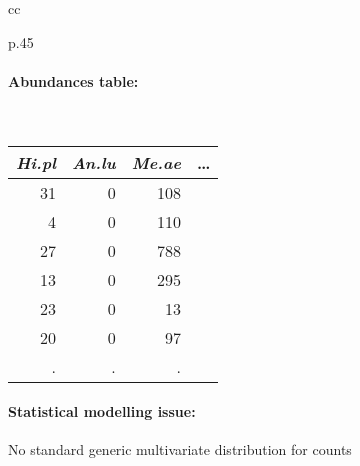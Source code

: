 \documentclass[8pt]{beamer}
\begin{document}
{\begin{tabular}{cc}
\begin{tabular}{p{}}
      \paragraph{Abundances table:} ~ \\
        {\footnotesize \begin{tabular}{rrrr}
        {\sl Hi.pl} & {\sl An.lu} & {\sl Me.ae} & \dots \\
        \hline
        31  &   0  & 108 & \\
         4  &   0  & 110 & \\
        27  &   0  & 788 & \\
        13  &   0  & 295 & \\
        23  &   0  &  13 & \\
        20  &   0  &  97 & \\
        . & . & . & 
      \end{tabular}} 
    \end{tabular}    
  \end{tabular}
  
  \bigskip
  \paragraph{Statistical modelling issue:} No standard generic multivariate distribution for counts

}
\end{document}
